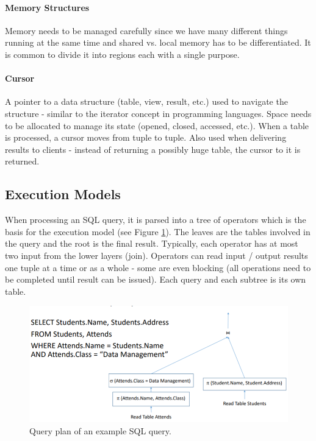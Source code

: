 \paragraph{Memory Structures}
Memory needs to be managed carefully since we have many different things running at the same time and shared vs. local memory has to be differentiated. It is common to divide it into regions each with a single purpose.

\paragraph{Cursor}
A pointer to a data structure (table, view, result, etc.) used to navigate the structure - similar to the iterator concept in programming languages. Space needs to be allocated to manage its state (opened, closed, accessed, etc.). When a table is processed, a cursor moves from tuple to tuple. Also used when delivering results to clients - instead of returning a possibly huge table, the cursor to it is returned.





\subsection{Execution Models}

When processing an SQL query, it is parsed into a tree of operators which is the basis for the execution model (see Figure \ref{fig:tree}). The leaves are the tables involved in the query and the root is the final result. Typically, each operator has at most two input from the lower layers (join). Operators can read input / output results one tuple at a time or as a whole - some are even blocking (all operations need to be completed until result can be issued). Each query and each subtree is its own table.

\begin{figure}[h]
	\centering
	\includegraphics[scale=0.6]{images/3-tree.PNG}
	\caption{Query plan of an example SQL query.}
	\label{fig:tree}
\end{figure}

